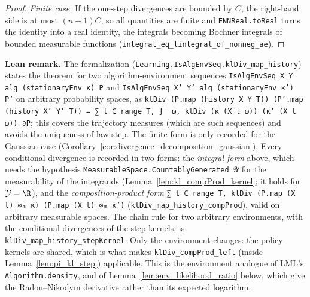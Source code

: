 \begin{proof}
\emph{Finite case.} If the one-step divergences are bounded by $C$, the right-hand side is at
most $(n+1)C$, so all quantities are finite and \texttt{ENNReal.toReal} turns the identity into
a real identity, the integrals becoming Bochner integrals of bounded measurable functions
(\texttt{integral\_eq\_lintegral\_of\_nonneg\_ae}).
\end{proof}

\textbf{Lean remark.} The formalization (\texttt{Learning.IsAlgEnvSeq.klDiv\_map\_history})
states the theorem for two algorithm-environment sequences \texttt{IsAlgEnvSeq X Y alg
(stationaryEnv κ) P} and \texttt{IsAlgEnvSeq X' Y' alg (stationaryEnv κ') P'} on arbitrary
probability spaces, as \texttt{klDiv (P.map (history X Y T)) (P'.map (history X' Y' T)) =
∑ t ∈ range T, ∫⁻ ω, klDiv (κ (X t ω)) (κ' (X t ω)) ∂P}; this covers the trajectory
measures (which are such sequences) and avoids the uniqueness-of-law step. The finite form is
only recorded for the Gaussian case (Corollary~\ref{cor:divergence_decomposition_gaussian}).
Every conditional divergence is recorded in two forms: the \emph{integral form} above, which
needs the hypothesis \texttt{MeasurableSpace.CountablyGenerated 𝓨} for the measurability of the
integrands (Lemma~\ref{lem:kl_compProd_kernel}; it holds for $\mathcal{Y} = \R$), and the
\emph{composition-product form} \texttt{∑ t ∈ range T, klDiv (P.map (X t) ⊗ₘ κ) (P.map
(X t) ⊗ₘ κ')} (\texttt{klDiv\_map\_history\_compProd}), valid on arbitrary measurable spaces.
The chain rule for two arbitrary environments, with the conditional divergences of the step
kernels, is \texttt{klDiv\_map\_history\_stepKernel}. Only the environment changes: the policy
kernels are shared, which is what makes \texttt{klDiv\_compProd\_left} (inside
Lemma~\ref{lem:pi_kl_step}) applicable. This is the environment analogue of LML's
\texttt{Algorithm.density}, and of Lemma~\ref{lem:env_likelihood_ratio} below, which give the
Radon--Nikodym derivative rather than its expected logarithm.

